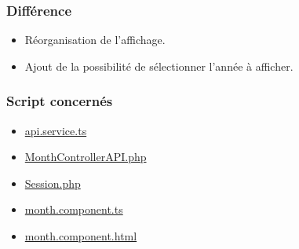 \subsubsection{Différence}
	\begin{itemize}
		\item Réorganisation de l'affichage. 
		\item Ajout de la possibilité de sélectionner l'année à afficher. 
	\end{itemize}
	
\vspace{\baselineskip}
\subsubsection{Script concernés}
	\begin{itemize}
		\item \href{https://github.com/victorsmits/Aquabike/blob/master/frontend/src/app/service/api.service.ts}{api.service.ts}
		\item \href{https://github.com/victorsmits/Aquabike/blob/master/backend/src/Controller/API/MonthControllerAPI.php}{MonthControllerAPI.php}
		\item \href{https://github.com/victorsmits/Aquabike/blob/master/backend/src/Entity/Session.php}{Session.php}
		\item \href{https://github.com/victorsmits/Aquabike/blob/master/frontend/src/app/month/month.component.ts}{month.component.ts}
		\item \href{https://github.com/victorsmits/Aquabike/blob/master/frontend/src/app/month/month.component.html}{month.component.html}
	\end{itemize}